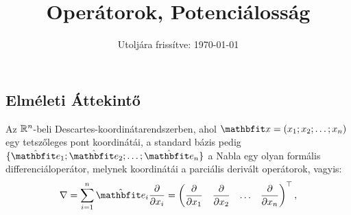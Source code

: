 \documentclass{szb-practice}
\title{Operátorok, Potenciálosság}
\date{Utoljára frissítve: \today}
\begin{document}
\maketitle

\vspace{-1em}
\subsection{Elméleti Áttekintő}
\vspace{1em}

\begin{definition}
  Az $\mathbb{R}^n$-beli Descartes-koordinátarendszerben, ahol $\rvec x = (x_1;
    x_2; \dots; x_n)$ egy tetszőleges pont koordinátái, a standard bázis pedig
  $\{ \uvec e_1; \uvec e_2; \dots; \uvec e_n \}$ a Nabla egy olyan formális
  differenciáloperátor, melynek koordinátái a parciális derivált operátorok,
  vagyis:
  $$
    \nabla = \sum_{i = 1}^n \uvec e_i \pdv{}{x_i}
    =
    \begin{pmatrix}
      \displaystyle\pdv{}{x_1} &
      \displaystyle\pdv{}{x_2} &
      \hdots                   &
      \displaystyle\pdv{}{x_n}
    \end{pmatrix}^\T
    \text,
  $$
\end{definition}
\end{document}
